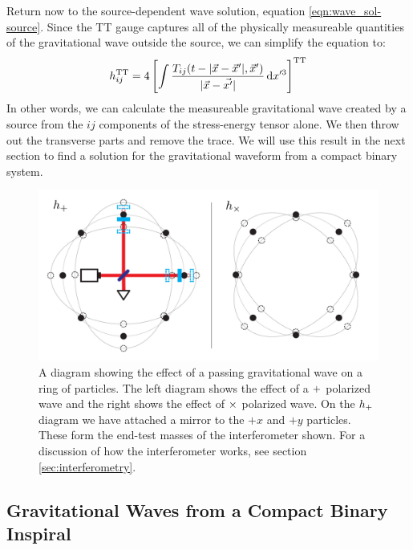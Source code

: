 Return now to the source-dependent wave solution, equation \ref{eqn:wave_sol-source}. Since the TT gauge captures all of the physically measureable quantities of the gravitational wave outside the source, we can simplify the equation to:
\begin{equation}
\label{eqn:wave_from_source}
h^\TT_{ij} = 4 \left[\int \frac{ T_{ij}(t - |\vec{x}-\vec{x}'|, \vec{x}')}{|\vec{x} - \vec{x'}|} \d x'^3\right]^\TT
\end{equation}
In other words, we can calculate the measureable gravitational wave created by a source from the $ij$ components of the stress-energy tensor alone. We then throw out the transverse parts and remove the trace. We will use this result in the next section to find a solution for the gravitational waveform from a compact binary system.

\begin{figure}[htb]
\center
\includegraphics[width=6in]{figures/hpls-hcrs.pdf}
\caption{A diagram showing the effect of a passing gravitational wave on a ring of particles. The left diagram shows the effect of a $+$ polarized wave and the right shows the effect of $\times$ polarized wave. On the $h_{+}$ diagram we have attached a mirror to the $+x$ and $+y$ particles. These form the end-test masses of the interferometer shown. For a discussion of how the interferometer works, see section \ref{sec:interferometry}.}
\label{fig:hpls-hcrs}
\end{figure}

\subsection{Gravitational Waves from a Compact Binary Inspiral}

